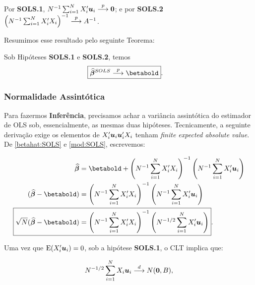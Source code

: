 \documentclass[11pt, oneside, a4paper, article]{article}
\numberwithin{equation}{section}
\begin{document}
Por \textbf{SOLS.1},
$N^{-1} \sum_{i=1}^{N} X_{i}' \boldsymbol{u}_{i}  \overset{p}{\longrightarrow}  \boldsymbol{0}$;
e por \textbf{SOLS.2}
$\left( N^{-1} \sum_{i=1}^{N} X_{i}' X_{i} \right)^{-1}  \overset{p}{\longrightarrow}  A^{-1}$.

Resumimos esse resultado pelo seguinte Teorema:

\begin{teo1}\label{SOLS:const}
Sob Hipóteses \textbf{SOLS.1} e \textbf{SOLS.2}, temos 
\begin{align*}
\Aboxed{
	\betahatbold^{SOLS} \arrowp \betabold
}.
\end{align*}
\end{teo1}

\subsubsection{Normalidade Assintótica}

Para fazermos \textbf{Inferência}, precisamos achar a variância assintótica do estimador de OLS sob, essencialmente, as mesmas duas hipóteses. 
Tecnicamente, a seguinte derivação exige os elementos de
$X_{i}' \boldsymbol{u}_{i} \boldsymbol{u}_{i}' X_{i}$
tenham \textit{finite expected absolute value}.
De \eqref{betahat:SOLS} e \eqref{mod:SOLS}, escrevemos:

\vspace{-1 em}
\begin{align*} 
\betahatbold  &=
\betabold +
\left( N^{-1} \sum_{i=1}^{N} X_{i}' X_{i}   \right)^{-1}
\left( N^{-1} \sum_{i=1}^{N} X_{i}' \mbs{u}_{i}   \right)
\\ 
(\betahatbold - \betabold) &= 
\left( N^{-1} \sum_{i=1}^{N} X_{i}' X_{i}   \right)^{-1}
\left( N^{-1} \sum_{i=1}^{N} X_{i}' \mbs{u}_{i}   \right)
\\ 
\Aboxed{
\sqrt{N}(\betahatbold - \betabold) &= 
\left( N^{-1} \sum_{i=1}^{N} X_{i}' X_{i}   \right)^{-1}
\left( N^{-1/2} \sum_{i=1}^{N} X_{i}' \mbs{u}_{i}   \right)
}.
\end{align*}

Uma vez que $\text{E}(X_{i}' \boldsymbol{u}_{i})=0$, sob a hipótese \textbf{SOLS.1}, o CLT implica que:

\vspace{-1 em}
\begin{align*} 
N^{-1/2} \sum_{i=1}^{N} X_{i} \boldsymbol{u}_{i}  \overset{d}{\longrightarrow}  N(\boldsymbol{0}, B),
\end{align*}
\end{document}
